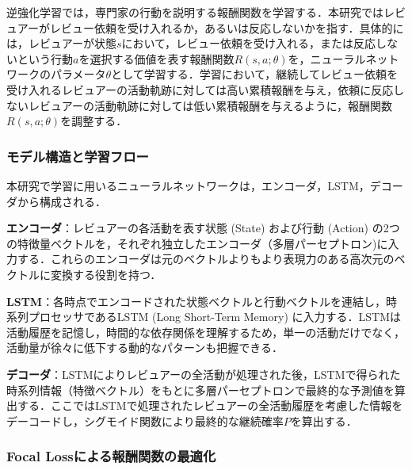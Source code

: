 \documentclass[submit,techrep,noauthor]{ipsj}
\begin{document}


逆強化学習では，専門家の行動を説明する報酬関数を学習する．本研究ではレビュアーがレビュー依頼を受け入れるか，あるいは反応しないかを指す．具体的には，レビュアーが状態$s$において，レビュー依頼を受け入れる，または反応しないという行動$a$を選択する価値を表す報酬関数$R(s, a; \theta)$を，ニューラルネットワークのパラメータ$\theta$として学習する．学習において，継続してレビュー依頼を受け入れるレビュアーの活動軌跡に対しては高い累積報酬を与え，依頼に反応しないレビュアーの活動軌跡に対しては低い累積報酬を与えるように，報酬関数$R(s, a; \theta)$を調整する．


\subsubsection{モデル構造と学習フロー}
本研究で学習に用いるニューラルネットワークは，エンコーダ，LSTM，デコーダから構成される．

\noindent\textbf{エンコーダ}：レビュアーの各活動を表す状態 (State) および行動 (Action) の2つの特徴量ベクトルを，それぞれ独立したエンコーダ（多層パーセプトロン)に入力する．これらのエンコーダは元のベクトルよりもより表現力のある高次元のベクトルに変換する役割を持つ．

\noindent\textbf{LSTM}：各時点でエンコードされた状態ベクトルと行動ベクトルを連結し，時系列プロセッサであるLSTM (Long Short-Term Memory) に入力する．LSTMは活動履歴を記憶し，時間的な依存関係を理解するため，単一の活動だけでなく，活動量が徐々に低下する動的なパターンも把握できる．

\noindent\textbf{デコーダ}：LSTMによりレビュアーの全活動が処理された後，LSTMで得られた時系列情報（特徴ベクトル）をもとに多層パーセプトロンで最終的な予測値を算出する．ここではLSTMで処理されたレビュアーの全活動履歴を考慮した情報をデーコードし，シグモイド関数により最終的な継続確率$P$を算出する．



\subsubsection{Focal Lossによる報酬関数の最適化}
\end{document}
